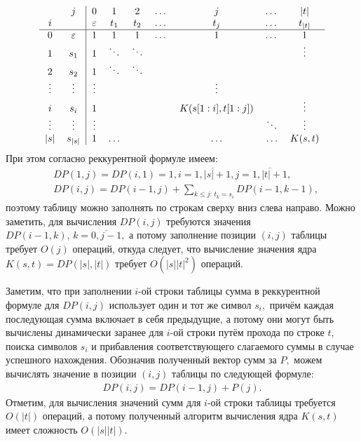 \documentclass[12pt,fleqn]{article}
\begin{document}
	\[\begin{tabular}{cc|ccccccc}
	& $j$ & 0 & 1 & 2 & $\dots$ & $j$ & $\dots$ & $|t|$ \\
	$i$ & & $\varepsilon$ & $t_1$ & $t_2$ & $\dots$ & $t_j$ & $\dots$ & $t_{|t|}$ \\
	\hline
	0& $\varepsilon$ & 1& 1& 1 & $\dots$& 1& $\dots$ & 1\\
	1& $s_1$ & 1& $\ddots$& $\ddots$& & & &$\vdots$\\
	2& $s_2$ & 1& $\ddots$& $\ddots$& & & &\\
	$\vdots$& $\vdots$ & $\vdots$& & & & $\vdots$& &\\
	$i$& $s_i$ & 1& & & & $K(s[1:i], t[1:j])$& &$\vdots$\\
	$\vdots$& $\vdots$ & $\vdots$& & & & & $\ddots$&$\vdots$\\
	$|s|$ & $s_{|s|}$ & 1& $\hdots$& & & $\hdots$& $\hdots$& $K(s, t)$\\
	
	\end{tabular}\]
	При этом согласно реккурентной формуле имеем:
	\begin{align*}
		&DP(1, j) =  DP(i, 1) = 1, i = \overline{1, |s| + 1}, j = \overline{1, |t| + 1},\\
		&DP(i, j) = DP(i-1, j) +  \sum_{k \le j: \, t_k = s_i} DP(i-1, k-1),
	\end{align*}
	поэтому таблицу можно заполнять по строкам сверху вниз слева направо. Можно заметить, для вычисления $DP(i, j)$ требуются значения $DP(i-1, k), \, k = \overline{0, j-1},$ а потому заполнение позиции $(i, j)$ таблицы требует $O(j)$ операций, откуда следует, что вычисление значения ядра $K(s, t) = DP(|s|, |t|)$ требует $O(|s| |t|^2)$ операций.
	\par Заметим, что при заполнении $i$-ой строки таблицы сумма в реккурентной формуле для $DP(i, j)$ использует один и тот же символ $s_i,$ причём каждая последующая сумма включает в себя предыдущие, а потому они могут быть вычислены динамически заранее для $i$-ой строки путём прохода по строке $t$, поиска символов $s_i$ и прибавления соответствующего слагаемого суммы в случае успешного нахождения. Обозначив полученный вектор сумм за $P,$ можем вычислять значение в позиции $(i, j)$ таблицы по следующей формуле:
	\begin{align*}
		DP(i, j) = DP(i-1, j) + P(j).
	\end{align*}
	Отметим, для вычисления значений сумм для $i$-ой строки таблицы требуется $O(|t|)$ операций, а потому полученный алгоритм вычисления ядра $K(s, t)$ имеет сложность $O(|s| |t|).$
\end{document}
